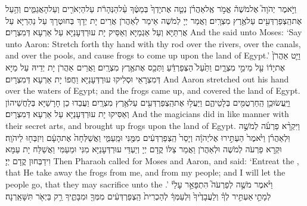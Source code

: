 \newperek
{}%
{וַיֹּ֣אמֶר יְהֹוָה֮ אֶל\maqqaf מֹשֶׁה֒ אֱמֹ֣ר אֶֽל\maqqaf אַהֲרֹ֗ן נְטֵ֤ה אֶת\maqqaf יָדְךָ֙ בְּמַטֶּ֔ךָ עַ֨ל\maqqaf הַנְּהָרֹ֔ת עַל\maqqaf הַיְאֹרִ֖ים וְעַל\maqqaf הָאֲגַמִּ֑ים וְהַ֥עַל אֶת\maqqaf הַֽצְפַרְדְּעִ֖ים עַל\maqqaf אֶ֥רֶץ מִצְרָֽיִם׃}
{וַאֲמַר יְיָ לְמֹשֶׁה אֵימַר לְאַהֲרֹן אֲרֵים יָת יְדָךְ בְּחוּטְרָךְ עַל נַהְרַיָּא עַל אֲרִתַּיָּא וְעַל אַגְמַיָּא וְאַסֵּיק יָת עוּרְדְּעָנַיָּא עַל אַרְעָא דְּמִצְרָיִם׃}
{And the \lord\space said unto Moses: ‘Say unto Aaron: Stretch forth thy hand with thy rod over the rivers, over the canals, and over the pools, and cause frogs to come up upon the land of Egypt.’}{}
{וַיֵּ֤ט אַהֲרֹן֙ אֶת\maqqaf יָד֔וֹ עַ֖ל מֵימֵ֣י מִצְרָ֑יִם וַתַּ֙עַל֙ הַצְּפַרְדֵּ֔עַ וַתְּכַ֖ס אֶת\maqqaf אֶ֥רֶץ מִצְרָֽיִם׃}
{וַאֲרֵים אַהֲרֹן יָת יְדֵיהּ עַל מַיָּא דְּמִצְרָאֵי וּסְלִיקוּ עוּרְדְּעָנַיָּא וַחֲפוֹ יָת אַרְעָא דְּמִצְרָיִם׃}
{And Aaron stretched out his hand over the waters of Egypt; and the frogs came up, and covered the land of Egypt.}{}
{וַיַּֽעֲשׂוּ\maqqaf כֵ֥ן הַֽחַרְטֻמִּ֖ים בְּלָטֵיהֶ֑ם וַיַּעֲל֥וּ אֶת\maqqaf הַֽצְפַרְדְּעִ֖ים עַל\maqqaf אֶ֥רֶץ מִצְרָֽיִם׃}
{וַעֲבַדוּ כֵן חָרָשַׁיָּא בְּלַחֲשֵׁיהוֹן וְאַסִּיקוּ יָת עוּרְדְּעָנַיָּא עַל אַרְעָא דְּמִצְרָיִם׃}
{And the magicians did in like manner with their secret arts, and brought up frogs upon the land of Egypt.}{}
{וַיִּקְרָ֨א פַרְעֹ֜ה לְמֹשֶׁ֣ה וּֽלְאַהֲרֹ֗ן וַיֹּ֙אמֶר֙ הַעְתִּ֣ירוּ אֶל\maqqaf יְהֹוָ֔ה וְיָסֵר֙ הַֽצְפַרְדְּעִ֔ים מִמֶּ֖נִּי וּמֵֽעַמִּ֑י וַאֲשַׁלְּחָה֙ אֶת\maqqaf הָעָ֔ם וְיִזְבְּח֖וּ לַיהֹוָֽה׃}
{וּקְרָא פַרְעֹה לְמֹשֶׁה וּלְאַהֲרֹן וַאֲמַר צַלּוֹ קֳדָם יְיָ וְיַעְדֵּי עוּרְדְּעָנַיָּא מִנִּי וּמֵעַמִּי וַאֲשַׁלַּח יָת עַמָּא וִידַבְּחוּן קֳדָם יְיָ׃}
{Then Pharaoh called for Moses and Aaron, and said: ‘Entreat the \lord, that He take away the frogs from me, and from my people; and I will let the people go, that they may sacrifice unto the \lord.’}{}
{וַיֹּ֨אמֶר מֹשֶׁ֣ה לְפַרְעֹה֮ הִתְפָּאֵ֣ר עָלַי֒ לְמָתַ֣י \legarmeh  אַעְתִּ֣יר לְךָ֗ וְלַעֲבָדֶ֙יךָ֙ וּֽלְעַמְּךָ֔ לְהַכְרִית֙ הַֽצְפַרְדְּעִ֔ים מִמְּךָ֖ וּמִבָּתֶּ֑יךָ רַ֥ק בַּיְאֹ֖ר תִּשָּׁאַֽרְנָה׃}
